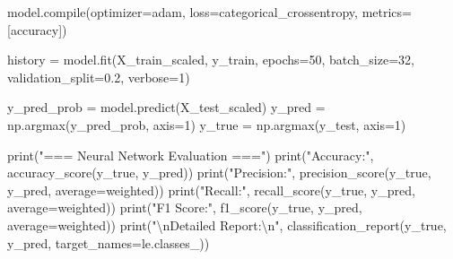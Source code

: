 \documentclass[
  letterpaper,
  DIV=11,
  numbers=noendperiod]{scrartcl}
\newenvironment{Shaded}{\begin{snugshade}}{\end{snugshade}}
\newcommand{\BuiltInTok}[1]{\textcolor[rgb]{0.00,0.23,0.31}{#1}}
\newcommand{\CharTok}[1]{\textcolor[rgb]{0.13,0.47,0.30}{#1}}
\newcommand{\DecValTok}[1]{\textcolor[rgb]{0.68,0.00,0.00}{#1}}
\newcommand{\FloatTok}[1]{\textcolor[rgb]{0.68,0.00,0.00}{#1}}
\newcommand{\NormalTok}[1]{\textcolor[rgb]{0.00,0.23,0.31}{#1}}
\newcommand{\OperatorTok}[1]{\textcolor[rgb]{0.37,0.37,0.37}{#1}}
\newcommand{\StringTok}[1]{\textcolor[rgb]{0.13,0.47,0.30}{#1}}
\begin{document}
\begin{Shaded}
\begin{Highlighting}[]
\NormalTok{model.}\BuiltInTok{compile}\NormalTok{(optimizer}\OperatorTok{=}\StringTok{\textquotesingle{}adam\textquotesingle{}}\NormalTok{, loss}\OperatorTok{=}\StringTok{\textquotesingle{}categorical\_crossentropy\textquotesingle{}}\NormalTok{, metrics}\OperatorTok{=}\NormalTok{[}\StringTok{\textquotesingle{}accuracy\textquotesingle{}}\NormalTok{])}

\NormalTok{history }\OperatorTok{=}\NormalTok{ model.fit(X\_train\_scaled, y\_train,}
\NormalTok{                    epochs}\OperatorTok{=}\DecValTok{50}\NormalTok{, batch\_size}\OperatorTok{=}\DecValTok{32}\NormalTok{,}
\NormalTok{                    validation\_split}\OperatorTok{=}\FloatTok{0.2}\NormalTok{, verbose}\OperatorTok{=}\DecValTok{1}\NormalTok{)}

\NormalTok{y\_pred\_prob }\OperatorTok{=}\NormalTok{ model.predict(X\_test\_scaled)}
\NormalTok{y\_pred }\OperatorTok{=}\NormalTok{ np.argmax(y\_pred\_prob, axis}\OperatorTok{=}\DecValTok{1}\NormalTok{)}
\NormalTok{y\_true }\OperatorTok{=}\NormalTok{ np.argmax(y\_test, axis}\OperatorTok{=}\DecValTok{1}\NormalTok{)}

\BuiltInTok{print}\NormalTok{(}\StringTok{"=== Neural Network Evaluation ==="}\NormalTok{)}
\BuiltInTok{print}\NormalTok{(}\StringTok{"Accuracy:"}\NormalTok{, accuracy\_score(y\_true, y\_pred))}
\BuiltInTok{print}\NormalTok{(}\StringTok{"Precision:"}\NormalTok{, precision\_score(y\_true, y\_pred, average}\OperatorTok{=}\StringTok{\textquotesingle{}weighted\textquotesingle{}}\NormalTok{))}
\BuiltInTok{print}\NormalTok{(}\StringTok{"Recall:"}\NormalTok{, recall\_score(y\_true, y\_pred, average}\OperatorTok{=}\StringTok{\textquotesingle{}weighted\textquotesingle{}}\NormalTok{))}
\BuiltInTok{print}\NormalTok{(}\StringTok{"F1 Score:"}\NormalTok{, f1\_score(y\_true, y\_pred, average}\OperatorTok{=}\StringTok{\textquotesingle{}weighted\textquotesingle{}}\NormalTok{))}
\BuiltInTok{print}\NormalTok{(}\StringTok{"}\CharTok{\textbackslash{}n}\StringTok{Detailed Report:}\CharTok{\textbackslash{}n}\StringTok{"}\NormalTok{, classification\_report(y\_true, y\_pred, target\_names}\OperatorTok{=}\NormalTok{le.classes\_))}
\end{Highlighting}
\end{Shaded}
\end{document}

